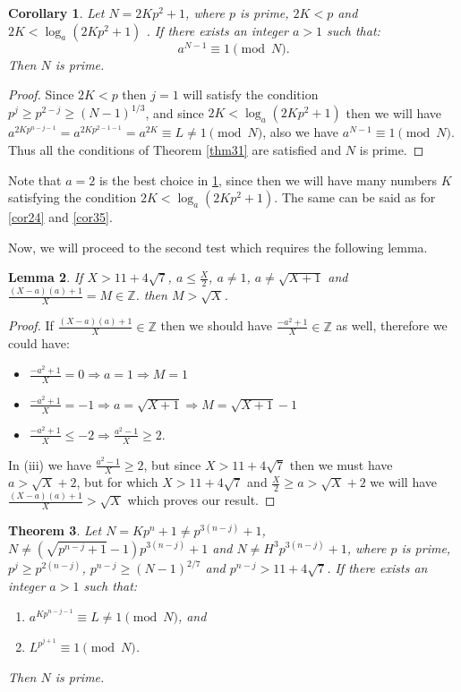 \documentclass{amsart}
\newtheorem{theorem}{Theorem}[section]
\newtheorem{lemma}[theorem]{Lemma}
\newtheorem{corollary}[theorem]{Corollary}
\numberwithin{equation}{section}
\begin{document}
\begin{corollary}\label{cor32}
	Let $N=2Kp^2+1$,  where $p$ is prime, $2K < p$ and $2K < \log_{a}(2Kp^2+1)$ . If there exists an integer $a>1$ such that:
	\begin{equation}
		a^{N-1} \equiv 1 \pmod N.
	\end{equation}
	Then $N$ is prime.
\end{corollary}

\begin{proof}
	Since $2K<p$ then $j=1$ will satisfy the condition $p^j \ge p^{2-j} \ge (N-1)^{1/3}$, and since $2K < \log_{a}(2Kp^2+1)$ then we will have $a^{2Kp^{n-j-1}}=a^{2Kp^{2-1-1}}=a^{2K}  \equiv L \neq 1 \pmod N$, also we have $a^{N-1} \equiv 1 \pmod N$. Thus all the conditions of Theorem \ref{thm31} are satisfied and $N$ is prime.
\end{proof}
Note that $a=2$ is the best choice in \ref{cor32}, since then we will have many numbers $K$ satisfying the condition $2K < \log_{a}(2Kp^2+1)$. The same can be said as for \ref{cor24} and \ref{cor35}.

Now, we will proceed to the second test which requires the following lemma.

\begin{lemma}\label{lem33}
	If $X > 11+4\sqrt{7}$, $a \le \frac{X}{2}$, $a \neq 1$, $a \neq \sqrt{X+1}$ and $\frac{(X-a)(a)+1}{X}=M \in \mathbb{Z}$. then $M > \sqrt{X}$.  
\end{lemma}

\begin{proof}
	If $\frac{(X-a)(a)+1}{X} \in \mathbb{Z}$ then we should have $\frac{-a^2+1}{X} \in \mathbb{Z}$ as well, therefore we could have: 
	\begin{itemize}
		\item[(i)] $\frac{-a^2+1}{X}=0 \Longrightarrow a=1 \Longrightarrow M=1 $
		\item[(ii)]$\frac{-a^2+1}{X}=-1  \Longrightarrow a=\sqrt{X+1} \Longrightarrow M=\sqrt{X+1}-1 $
		\item[(iii)]$\frac{-a^2+1}{X} \le -2 \Longrightarrow  \frac{a^2-1}{X} \ge 2 $.
	\end{itemize}
	In (iii) we have $\frac{a^2-1}{X} \ge 2 $, but since $X > 11+4\sqrt{7}$ then we must have $ a > \sqrt{X}+2$, but for which $X > 11+4\sqrt{7}$ and $\frac{X}{2} \ge a > \sqrt{X}+2$ we will have $\frac{(X-a)(a)+1}{X} > \sqrt{X}$ which proves our result. 
\end{proof}


\begin{theorem}\label{thm34}
	Let $N=Kp^n+1 \neq p^{3(n-j)}+1$, $N \neq (\sqrt{p^{n-j}+1}-1)p^{3(n-j)}+1$ and $N \neq H^3p^{3(n-j)}+1$, where $p$ is prime, $p^j \ge p^{2(n-j)} $, $p^{n-j} \ge (N-1)^{2/7}$ and $p^{n-j} > 11+4\sqrt{7}$. If there exists an integer $a>1$ such that:
	\begin{enumerate}
		\item[(i)] $a^{Kp^{n-j-1}} \equiv L \neq 1 \pmod N$, and
		\item[(ii)] $L^{p^{j+1}} \equiv 1 \pmod N$.
	\end{enumerate}
	Then $N$ is prime.
\end{theorem}
\end{document}
